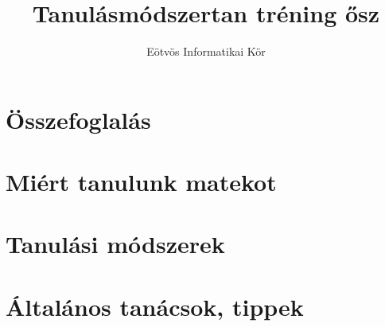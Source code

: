 \documentclass[12pt]{article}
\title{Tanulásmódszertan tréning ősz}
\author{Eötvös Informatikai Kör}
\date{ }
\begin{document}
\maketitle

\section{Összefoglalás}


\section{Miért tanulunk matekot}


\section{Tanulási módszerek}


\section{Általános tanácsok, tippek}

\end{document}
